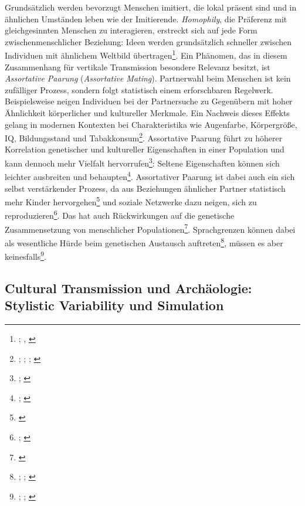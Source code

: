 \documentclass[openany,twoside,twocolumn]{book}
\let\rmarkdownfootnote\footnote%
\def\footnote{\protect\rmarkdownfootnote}
\begin{document}
Grundsätzlich werden bevorzugt Menschen imitiert, die lokal präsent sind
und in ähnlichen Umständen leben wie der Imitierende. \emph{Homophily},
die Präferenz mit gleichgesinnten Menschen zu interagieren, erstreckt
sich auf jede Form zwischenmenschlicher Beziehung: Ideen werden
grundsätzlich schneller zwischen Individuen mit ähnlichem Weltbild
übertragen\footnote{\textcite{centola_experimental_2011};
  \textcite{centola_spread_2010}, \textcite{schlag_why_1998}}. Ein
Phänomen, das in diesem Zusammenhang für vertikale Transmission
besondere Relevanz besitzt, ist \emph{Assortative Paarung}
(\emph{Assortative Mating}). Partnerwahl beim Menschen ist kein
zufälliger Prozess, sondern folgt statistisch einem erforschbaren
Regelwerk. Beispielsweise neigen Individuen bei der Partnersuche zu
Gegenübern mit hoher Ähnlichkeit körperlicher und kultureller Merkmale.
Ein Nachweis dieses Effekts gelang in modernen Kontexten bei
Charakteristika wie Augenfarbe, Körpergröße, IQ, Bildungsstand und
Tabakkonsum\footnote{\textcite{domingue_genetic_2014};
  \textcite{keller_genetic_2013}; \textcite{laeng_why_2007};
  \textcite{treur_spousal_2015}}. Assortative Paarung führt zu höherer
Korrelation genetischer und kultureller Eigenschaften in einer
Population und kann dennoch mehr Vielfalt hervorrufen\footnote{\textcite{feldman_evolution_1977};
  \textcite{rice_multifactorial_1978}}: Seltene Eigenschaften können
sich leichter ausbreiten und behaupten\footnote{\textcite{creanza_complexity_2014};
  \textcite{creanza_models_2012}}. Assortativer Paarung ist dabei auch
ein sich selbst verstärkender Prozess, da aus Beziehungen ähnlicher
Partner statistisch mehr Kinder hervorgehen\footnote{\textcite{thiessen_human_1980}}
und soziale Netzwerke dazu neigen, sich zu reproduzieren\footnote{\textcite{abdellaoui_association_2013};
  \textcite{abdellaoui_educational_2015}}. Das hat auch Rückwirkungen
auf die genetische Zusammensetzung von menschlicher
Populationen\footnote{\textcite{robinson_genetic_2017}}. Sprachgrenzen
können dabei als wesentliche Hürde beim genetischen Austausch
auftreten\footnote{\textcite{barbujani_zones_1990};
  \textcite{de_filippo_y-chromosomal_2011};
  \textcite{karafet_coevolution_2016}}, müssen es aber
keinesfalls\footnote{\textcite{hunley_gene_2005};
  \textcite{hunley_genetic_2008}; \textcite{srithawong_genetic_2015}}.

\hypertarget{stylistic-variability}{%
\subsection{Cultural Transmission und Archäologie: Stylistic Variability
und Simulation}\label{stylistic-variability}}
\end{document}
